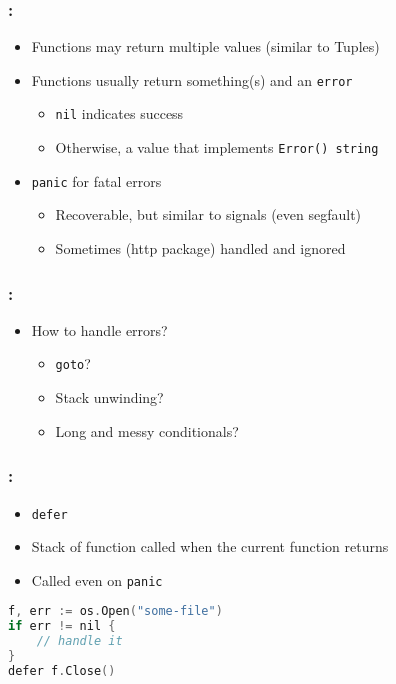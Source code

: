 \begin{frame}
    \frametitle{\secname: \small\subsecname\normalsize}

    \begin{itemize}
        \item Functions may return multiple values (similar to Tuples)
        \item Functions usually return something(s) and an \texttt{error}
        \begin{itemize}
            \item \texttt{nil} indicates success
            \item Otherwise, a value that implements \texttt{Error() string}
        \end{itemize}
        \item \texttt{panic} for fatal errors
        \begin{itemize}
            \item Recoverable, but similar to signals (even segfault)
            \item Sometimes (http package) handled and ignored
        \end{itemize}
    \end{itemize}
\end{frame}

\begin{frame}
    \frametitle{\secname: \small\subsecname\normalsize}

    \begin{itemize}
        \item How to handle errors?
        \begin{itemize}
            \item \texttt{goto}?
            \item Stack unwinding?
            \item Long and messy conditionals?
        \end{itemize}
    \end{itemize}
\end{frame}

\begin{frame}[fragile]
    \frametitle{\secname: \small\subsecname\normalsize}

    \begin{itemize}
        \item \texttt{defer}
        \item Stack of function called when the current function returns
        \item Called even on \texttt{panic}
    \end{itemize}

    \small \begin{lstlisting}[language=c]
f, err := os.Open("some-file")
if err != nil {
    // handle it
}
defer f.Close()
    \end{lstlisting} \normalsize
\end{frame}

